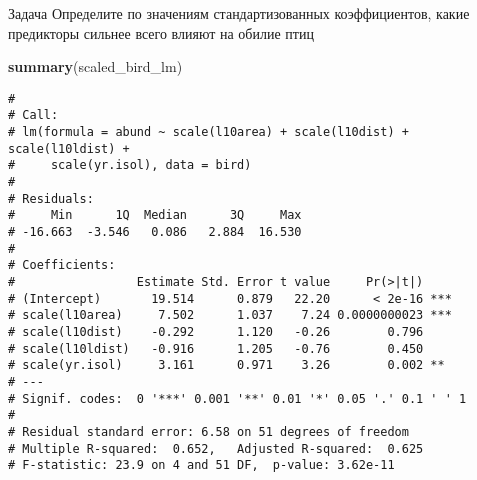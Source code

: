 \documentclass[
  ignorenonframetext,
  t,xcolor=table]{beamer}
\newenvironment{Shaded}{\begin{snugshade}}{\end{snugshade}}
\newcommand{\FunctionTok}[1]{\textcolor[rgb]{0.13,0.29,0.53}{\textbf{#1}}}
\newcommand{\NormalTok}[1]{#1}
\begin{document}
\begin{frame}[fragile]{Задача}
\protect\hypertarget{ux437ux430ux434ux430ux447ux430-2}{}
Определите по значениям стандартизованных коэффициентов, какие
предикторы сильнее всего влияют на обилие птиц

\fontsize{10pt}{10pt}

\begin{Shaded}
\begin{Highlighting}[]
\FunctionTok{summary}\NormalTok{(scaled\_bird\_lm)}
\end{Highlighting}
\end{Shaded}

\begin{verbatim}
# 
# Call:
# lm(formula = abund ~ scale(l10area) + scale(l10dist) + scale(l10ldist) + 
#     scale(yr.isol), data = bird)
# 
# Residuals:
#     Min      1Q  Median      3Q     Max 
# -16.663  -3.546   0.086   2.884  16.530 
# 
# Coefficients:
#                 Estimate Std. Error t value     Pr(>|t|)    
# (Intercept)       19.514      0.879   22.20      < 2e-16 ***
# scale(l10area)     7.502      1.037    7.24 0.0000000023 ***
# scale(l10dist)    -0.292      1.120   -0.26        0.796    
# scale(l10ldist)   -0.916      1.205   -0.76        0.450    
# scale(yr.isol)     3.161      0.971    3.26        0.002 ** 
# ---
# Signif. codes:  0 '***' 0.001 '**' 0.01 '*' 0.05 '.' 0.1 ' ' 1
# 
# Residual standard error: 6.58 on 51 degrees of freedom
# Multiple R-squared:  0.652,   Adjusted R-squared:  0.625 
# F-statistic: 23.9 on 4 and 51 DF,  p-value: 3.62e-11
\end{verbatim}
\end{frame}
\end{document}
